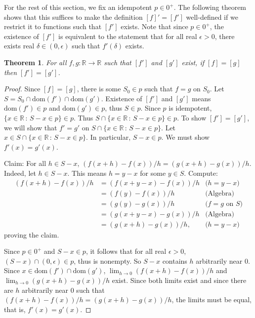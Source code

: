 \documentclass[microtype]{jloganal}
\newtheorem{theorem}{Theorem}
\begin{document}
For the rest of this section, we fix an idempotent $p\in 0^+$.
The following theorem shows that this suffices to make the
definition $[f]'=[f']$ well-defined if we restrict it to
functions such that $[f']$ exists. Note that since $p\in 0^+$,
the existence of $[f']$ is equivalent to the statement that for all
real $\epsilon>0$, there exists real $\delta\in (0,\epsilon)$ such that
$f'(\delta)$ exists.

\begin{theorem}
\label{firsttheorem}
    For all $f,g:\mathbb R\to\mathbb R$ such that $[f']$ and $[g']$ exist,
    if $[f]=[g]$ then $[f']=[g']$.
\end{theorem}

\begin{proof}
    Since $[f]=[g]$, there is some $S_0\in p$ such that
    $f=g$ on $S_0$. Let $S=S_0\cap \mathrm{dom}(f')\cap \mathrm{dom}(g')$.
    Existence of $[f']$ and $[g']$ means $\mathrm{dom}(f')\in p$
    and $\mathrm{dom}(g')\in p$, thus $S\in p$.
    Since $p$ is idempotent, $\{x\in\mathbb R\,:\,S-x\in p\}\in p$.
    Thus $S\cap \{x\in\mathbb R\,:\,S-x\in p\}\in p$.
    To show $[f']=[g']$, we will show that
    $f'=g'$ on $S\cap \{x\in\mathbb R\,:\,S-x\in p\}$.
    Let $x\in S\cap \{x\in\mathbb R\,:\,S-x\in p\}$.
    In particular, $S-x\in p$. We must show $f'(x)=g'(x)$.

    Claim: For all $h\in S-x$, $(f(x+h)-f(x))/h=(g(x+h)-g(x))/h$.
    Indeed, let $h\in S-x$. This means $h=y-x$ for some $y\in S$.
    Compute:
    \begin{align*}
        (f(x+h)-f(x))/h
            &= (f(x+y-x)-f(x))/h
                &\mbox{($h=y-x$)}\\
            &= (f(y)-f(x))/h
                &\mbox{(Algebra)}\\
            &= (g(y)-g(x))/h
                &\mbox{($f=g$ on $S$)}\\
            &= (g(x+y-x)-g(x))/h
                &\mbox{(Algebra)}\\
            &= (g(x+h)-g(x))/h,
                &\mbox{($h=y-x$)}
    \end{align*}
    proving the claim.

    Since $p\in0^+$ and $S-x\in p$,
    it follows that for all real $\epsilon>0$, $(S-x)\cap (0,\epsilon)\in p$,
    thus is nonempty.
    So $S-x$ contains $h$ arbitrarily near $0$.
    Since $x\in \mathrm{dom}(f')\cap \mathrm{dom}(g')$,
    $\lim_{h\to 0}(f(x+h)-f(x))/h$ and $\lim_{h\to 0}(g(x+h)-g(x))/h$
    exist. Since both limits exist and since there are $h$ arbitrarily near $0$
    such that $(f(x+h)-f(x))/h=(g(x+h)-g(x))/h$,
    the limits must be equal, that is, $f'(x)=g'(x)$.
\end{proof}
\end{document}

